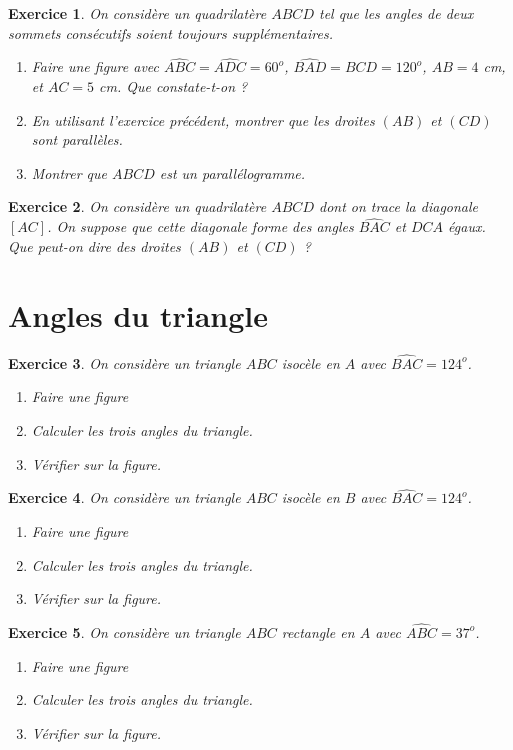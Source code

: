 \documentclass[12 pt]{article}
\theoremstyle{plain}
\newcounter{n}
\numberwithin{n}{section}
\newtheorem{exo}{Exercice}
\begin{document}
\begin{exo}
On considère un quadrilatère $ABCD$ tel que les angles de deux sommets consécutifs soient toujours supplémentaires. 
\begin{enumerate}
\item Faire une figure avec $\widehat{ABC}= \widehat{ADC}=60^o$, $\widehat{BAD}=\widehat{BCD}=120^o$, $AB = 4$ cm, et $AC= 5$ cm. Que constate-t-on ? 
\item En utilisant l'exercice précédent, montrer que les droites $(AB)$ et $(CD)$ sont parallèles.
\item Montrer que $ABCD$ est un parallélogramme.
\end{enumerate}
\end{exo}
\begin{exo}
On considère un quadrilatère $ABCD$ dont on trace la diagonale $[AC]$. On suppose que cette diagonale forme des angles $\widehat{BAC}$ et $\widehat{DCA}$ égaux. Que peut-on dire des droites $(AB)$ et $(CD)$ ?
\end{exo}
\section{Angles du triangle}

\begin{exo}
On considère un triangle $ABC$ isocèle en $A$ avec $\widehat{BAC}= 124^o$. 
\begin{enumerate}
\item Faire une figure
\item Calculer les trois angles du triangle.
\item Vérifier sur la figure.
\end{enumerate}
\end{exo}

\begin{exo}
On considère un triangle $ABC$ isocèle en $B$ avec $\widehat{BAC}= 124^o$. 
\begin{enumerate}
\item Faire une figure
\item Calculer les trois angles du triangle.
\item Vérifier sur la figure.
\end{enumerate}
\end{exo}
\begin{exo}
On considère un triangle $ABC$ rectangle en $A$ avec $\widehat{ABC}=37^o$. 
\begin{enumerate}
\item Faire une figure
\item Calculer les trois angles du triangle.
\item Vérifier sur la figure.
\end{enumerate}
\end{exo}
\end{document}
